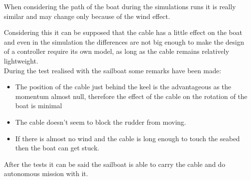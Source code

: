 When considering the path of the boat during the simulations runs it is really similar and may change only because of the wind effect.

Considering this it can be supposed that the cable has a little effect on the boat and even in the simulation the differences are not big enough to make the design of a controller require its own model, as long as the cable remains relatively lightweight.\\
 
During the test realised with the sailboat some remarks have been made:

 
 \begin{itemize}[label=$-$,itemsep=0cm,topsep=0cm]
\item  The position of the cable just behind the keel is the advantageous as the momentum almost null, therefore the effect of the cable on the rotation of the boat is minimal
\item The cable doesn't seem to block the rudder from moving.
\item If there is almost no wind and the cable is long enough to touch the seabed then the boat can get stuck.
\end{itemize}

After the tests it can be said the sailboat is able to carry the cable and do autonomous mission with it.
